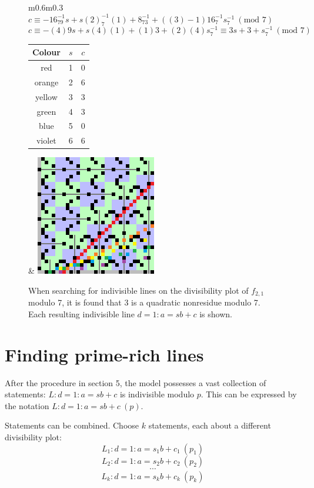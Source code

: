 \documentclass{article}
\begin{document}
\begin{figure}[h!]
	\centering
	\begin{tabular}{m{}m{}}
		\centering
		\(c \equiv -16^{-1}_79s + s(2)^{-1}_7(1) + 8^{-1}_73 + ((3)-1)16^{-1}_7s^{-1}_7\ (\text{mod }7)\)
		\[c \equiv -(4)9s + s(4)(1) + (1)3 + (2)(4)s^{-1}_7 \equiv 3s + 3 + s^{-1}_7\ (\text{mod }7)\]
		\begin{tabular}{|c|c|c|}
			\hline
			Colour & \(s\) & \(c\) \\
			\hline
			red & 1 & 0 \\
			orange & 2 & 6 \\
			yellow & 3 & 3 \\
			green & 4 & 3 \\
			blue & 5 & 0 \\
			violet & 6 & 6 \\
			\hline
		\end{tabular} &
		\includegraphics{rainbow}
	\end{tabular}
	\caption{When searching for indivisible lines on the divisibility plot of \(f_{2,1}\) modulo 7, it is found that 3 is a quadratic nonresidue modulo 7. Each resulting indivisible line \(d=1:a=sb+c\) is shown.}
	\label{rainbow}
\end{figure}



\section{Finding prime-rich lines}

After the procedure in section 5, the model possesses a vast collection of statements: \(L:d=1:a=sb+c\) is indivisible modulo \(p\). This can be expressed by the notation \(L:d=1:a=sb+c\ (p)\).

Statements can be combined. Choose \(k\) statements, each about a different divisibility plot:
	\[L_1:d=1:a=s_1b+c_1\ (p_1)\]
	\[L_2:d=1:a=s_2b+c_2\ (p_2)\]
	\[\cdots\]
	\[L_k:d=1:a=s_kb+c_k\ (p_k)\]
	
\end{document}

